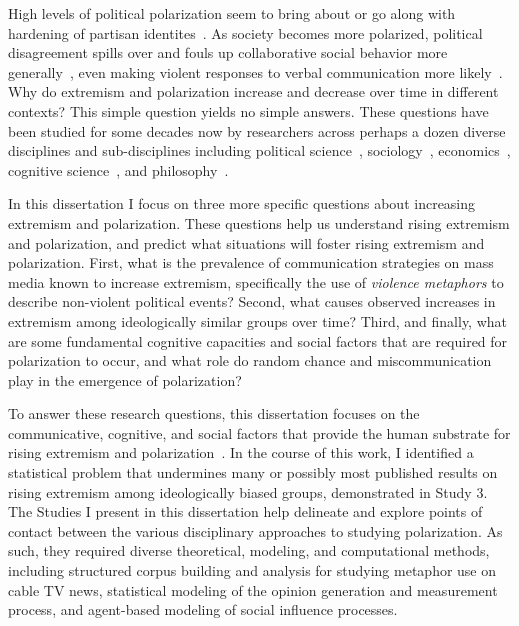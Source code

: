 
High levels of political polarization seem to bring about or go along with
hardening of partisan identites~\cite{Lee2015}.
As society becomes more polarized, political disagreement spills over
and fouls up collaborative social behavior
more generally~\cite{Iyengar2019}, even making violent responses to verbal 
communication more likely~\cite{Kalmoe2014,Kalmoe2018,Mason2018UncivilAgreementBook}.
Why do extremism and polarization increase and decrease over time in different contexts? 
This simple question yields no simple answers. These questions
have been studied for some decades now by researchers across perhaps a dozen
diverse disciplines and sub-disciplines including 
political science~\cite{Mason2018UncivilAgreementBook,Boxell2020}, 
sociology~\cite{Baldassarri2007,Flache2011}, 
economics~\cite{Schelling1971,Dixit2007}, cognitive science~\cite{Rollwage2019}, 
and philosophy~\cite{OConnor2018}.

In this dissertation I focus
on three more specific questions about increasing extremism and polarization.
These questions help us understand rising extremism and polarization, and
predict what situations will foster rising extremism and polarization.
First, what is the prevalence of communication strategies on mass media
known to increase extremism, specifically the use of \emph{violence metaphors}
to describe non-violent political events? Second, what causes observed
increases in extremism among ideologically similar groups over time?
Third, and finally, what are some fundamental cognitive capacities and
social factors that are required for polarization to occur, and what
role do random chance and miscommunication play in the emergence of
polarization? 

To answer these research questions, this dissertation focuses on the communicative, cognitive,
and social factors that provide the human substrate for rising extremism
and polarization~\cite{Jung2019,Rollwage2019}. 
In the course of this work, I identified a statistical
problem that undermines many or possibly most published results on rising
extremism among ideologically biased groups, demonstrated in Study 3.
The Studies I present in this dissertation help delineate and explore points of contact between
the various disciplinary approaches to studying polarization. As such, they
required diverse theoretical, modeling, and computational methods, 
including structured corpus building and analysis for studying metaphor
use on cable TV news, statistical modeling of the opinion generation and
measurement process, and agent-based modeling of social influence processes.

